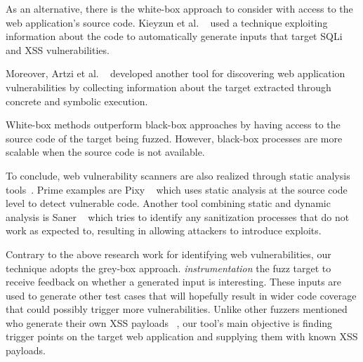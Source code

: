 As an alternative, there is the white-box approach to consider with access to the web application's source code. Kieyzun et al. ~\cite{kieyzun2009automatic} used a technique exploiting information about the code to automatically generate inputs that target SQLi and XSS vulnerabilities. 

Moreover, Artzi et al. ~\cite{artzi2010finding} developed another tool for discovering web
application vulnerabilities by collecting information about the target extracted through concrete and symbolic execution.

White-box methods outperform black-box approaches by having access to the source code of the target being fuzzed. However, black-box processes are more scalable when the source code is not 
available. 

To conclude, web vulnerability scanners are also realized through static analysis tools~\cite{balzarotti2008saner,jovanovic2006pixy,jovanovic2006precise,medeiros2014mining,medeiros2016dekant}. Prime examples are Pixy ~\cite{jovanovic2006pixy} which uses static analysis at the source code
level to detect vulnerable code. Another tool combining static and dynamic analysis is Saner ~\cite{balzarotti2008saner} which tries to identify any sanitization processes that do not work as expected to, resulting in allowing attackers to introduce exploits.

Contrary to the above research work for identifying web vulnerabilities, our technique adopts the
grey-box approach. \pname{} \emph{instrumentation} the fuzz target to receive feedback on whether a generated input is interesting. These inputs are used to generate other test cases that will hopefully result in wider code coverage that could possibly trigger more vulnerabilities. Unlike other fuzzers mentioned who generate their own XSS payloads ~\cite{duchene2014kameleonfuzz}, our tool's  main objective is finding trigger points on the target web application and supplying them with known XSS payloads.